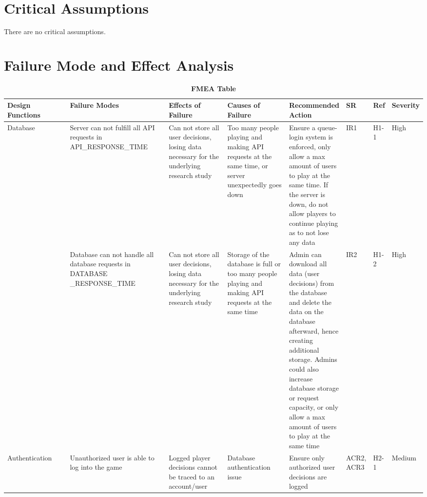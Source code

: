 \documentclass{article}
\begin{document}
\section{Critical Assumptions}
There are no critical assumptions. 

\section{Failure Mode and Effect Analysis}

\begin{table}[H]
    \caption{\bf FMEA Table}
    \begin{adjustbox}{width=\textwidth}
    \centering
    

    \begin{tabular}{|p{0.20\linewidth} | p{0.30\linewidth} | p{0.20\linewidth}|  p{0.20\linewidth}|  p{0.30\linewidth}|  p{0.07\linewidth}|  p{0.07\linewidth}|p{0.12\linewidth}| }
    \hline
         \textbf{Design Functions} & \textbf{Failure Modes} & \textbf{Effects of Failure} & \textbf{Causes of Failure} & \textbf{Recommended Action} & \textbf{SR} & \textbf{Ref} & \textbf{Severity}\\
         \hline
         Database & Server can not fulfill all API requests in API\_RESPONSE\_TIME& Can not store all user decisions, losing data necessary for the underlying research study & Too many people playing and making API requests at the same time, or server unexpectedly goes down & Ensure a queue-login system is enforced, only allow a max amount of users to play at the same time. If the server is down, do not allow players to continue playing as to not lose any data\newline   & IR1 & H1-1 & High\\
          & Database can not handle all database requests in DATABASE \_RESPONSE\_TIME & Can not store all user decisions, losing data necessary for the underlying research study & Storage of the database is full or too many people playing and making API requests at the same time& Admin can download all data (user decisions) from the database and delete the data on the database afterward, hence creating additional storage. Admins could also increase database storage or request capacity, or only allow a max amount of users to play at the same time   & IR2 & H1-2 & High\\
          \hline
         Authentication & Unauthorized user is able to log into the game & Logged player decisions cannot be traced to an account/user \newline & Database authentication issue & Ensure only authorized user decisions are logged & ACR2, ACR3 & H2-1 & Medium\\

\end{tabular}
\end{adjustbox}
\end{table}
\end{document}
